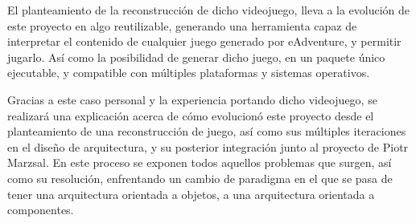 El planteamiento de la reconstrucción de dicho videojuego, lleva a la evolución de este proyecto en algo reutilizable, generando una herramienta capaz de interpretar el contenido de cualquier juego generado por eAdventure, y permitir jugarlo. Así como la posibilidad de generar dicho juego, en un paquete único ejecutable, y compatible con múltiples plataformas y sistemas operativos.

Gracias a este caso personal y la experiencia portando dicho videojuego, se realizará una explicación acerca de cómo evolucionó este proyecto desde el planteamiento de una reconstrucción de juego, así como sus múltiples iteraciones en el diseño de arquitectura, y su posterior integración junto al proyecto de Piotr Marzsal. En este proceso se exponen todos aquellos problemas que surgen, así como su resolución, enfrentando un cambio de paradigma en el que se pasa de tener una arquitectura orientada a objetos, a una arquitectura orientada a componentes. 


%
%
%



